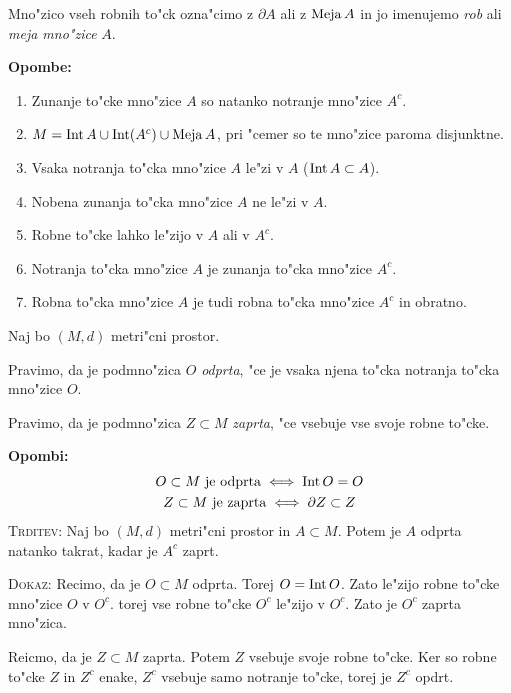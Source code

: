 Mno"zico vseh robnih to"ck ozna"cimo z $\partial A$ ali z $\operatorname{Meja} A$ in jo imenujemo \emph{rob} ali \emph{meja mno"zice} $A$.

\textbf{Opombe:}
\begin{enumerate}
    \item Zunanje to"cke mno"zice $A$ so natanko notranje mno"zice $A^c$.
    \item $M = \operatorname{Int} A \cup \operatorname{Int}(A^c) \cup \operatorname{Meja} A$, pri "cemer so te mno"zice paroma disjunktne.
    \item Vsaka notranja to"cka mno"zice $A$ le"zi v $A$ ($\operatorname{Int} A \subset A$).
    \item Nobena zunanja to"cka mno"zice $A$ ne le"zi v $A$.
    \item Robne to"cke lahko le"zijo v $A$ ali v $A^c$.
    \item Notranja to"cka mno"zice $A$ je zunanja to"cka mno"zice $A^c$.
    \item Robna to"cka mno"zice $A$ je tudi robna to"cka mno"zice $A^c$ in obratno.
\end{enumerate}
%
 Naj bo $(M, d)$ metri"cni prostor.

 Pravimo, da je podmno"zica $O$ \emph{odprta}, "ce je vsaka njena to"cka notranja to"cka mno"zice $O$.

Pravimo, da je podmno"zica $Z \subset M$ \emph{zaprta}, "ce vsebuje vse svoje robne to"cke.

\textbf{Opombi:}
\begin{gather*}
O \subset M \text{ je odprta} \iff \operatorname{Int} O = O \\
Z \subset M \text{ je zaprta} \iff \partial Z \subset Z
\end{gather*}
%
\textsc{Trditev:} Naj bo $(M, d)$ metri"cni prostor in $A \subset M$. Potem je $A$ odprta natanko takrat, kadar je $A^c$ zaprt.

\textsc{Dokaz:} Recimo, da je $O \subset M$ odprta. Torej $O = \operatorname{Int} O$. Zato le"zijo robne to"cke mno"zice $O$ v $O^c$. torej vse robne to"cke $O^c$ le"zijo v $O^c$. Zato je $O^c$ zaprta mno"zica.

Reicmo, da je $Z \subset M$ zaprta. Potem $Z$ vsebuje svoje robne to"cke. Ker so robne to"cke $Z$ in $Z^c$ enake, $Z^c$ vsebuje samo notranje to"cke, torej je $Z^c$ opdrt.

